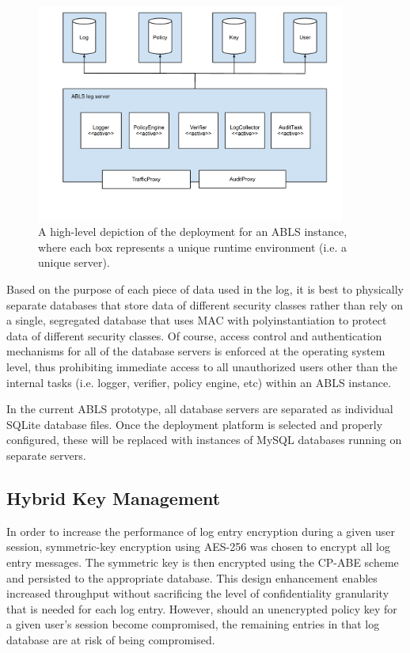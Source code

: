 \documentclass{sig-alternate}
\begin{document}
\begin{figure}[htb!]
\begin{center}
\includegraphics[width=4in]{images/deployment.pdf}
\caption{A high-level depiction of the deployment for an ABLS instance, where each box represents a unique runtime environment (i.e. a unique server).}
\label{fig:deployment}
\end{center}
\end{figure}

Based on the purpose of each piece of data used in the log, it is best to physically separate databases
that store data of different security classes rather than rely on a single, segregated database that uses MAC with 
polyinstantiation to protect data of different security classes. Of course, access control
and authentication mechanisms for all of the database servers is enforced at the operating system level, thus
prohibiting immediate access to all unauthorized users other than the internal tasks (i.e. logger, verifier, policy engine, etc) 
within an ABLS instance. 

In the current ABLS prototype, all database servers are separated as individual SQLite database files. Once
the deployment platform is selected and properly configured, these will be replaced with instances of MySQL 
databases running on separate servers.

\subsection{Hybrid Key Management}
\label{sec:keyMgmt}


In order to increase the performance of log entry encryption during a given user session, symmetric-key encryption
using AES-256 was chosen to encrypt all log entry messages. The symmetric key is then encrypted using the CP-ABE
scheme and persisted to the appropriate database. This design enhancement enables increased throughput
without sacrificing the level of confidentiality granularity that is needed for each log entry. However, should an 
unencrypted policy key for a given user's session become compromised, the remaining entries in that log database
are at risk of being compromised. 
\end{document}
